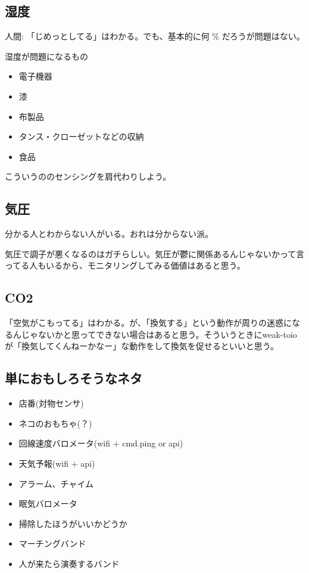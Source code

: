 \documentclass[fleqn,twocolumn]{mynote}
\begin{document}
  \subsection*{湿度}
  人間: 「じめっとしてる」はわかる。でも、基本的に何 \% だろうが問題はない。

  湿度が問題になるもの
  \begin{itemize}
    \item 電子機器
    \item 漆
    \item 布製品
    \item タンス・クローゼットなどの収納
    \item 食品
  \end{itemize}

  こういうののセンシングを肩代わりしよう。

  \subsection*{気圧}
  分かる人とわからない人がいる。おれは分からない派。

  気圧で調子が悪くなるのはガチらしい。気圧が鬱に関係あるんじゃないかって言ってる人もいるから、モニタリングしてみる価値はあると思う。

  \subsection*{CO2}
  「空気がこもってる」はわかる。が、「換気する」という動作が周りの迷惑になるんじゃないかと思ってできない場合はあると思う。そういうときにweak-toioが「換気してくんねーかなー」な動作をして換気を促せるといいと思う。

  \subsection*{単におもしろそうなネタ}
  \begin{itemize}
    \item 店番(対物センサ)
    \item ネコのおもちゃ(？)
    \item 回線速度バロメータ(wifi + cmd.ping or api)
    \item 天気予報(wifi + api)
    \item アラーム、チャイム
    \item 眠気バロメータ
    \item 掃除したほうがいいかどうか
    \item マーチングバンド
    \item 人が来たら演奏するバンド
  \end{itemize}
\end{document}
